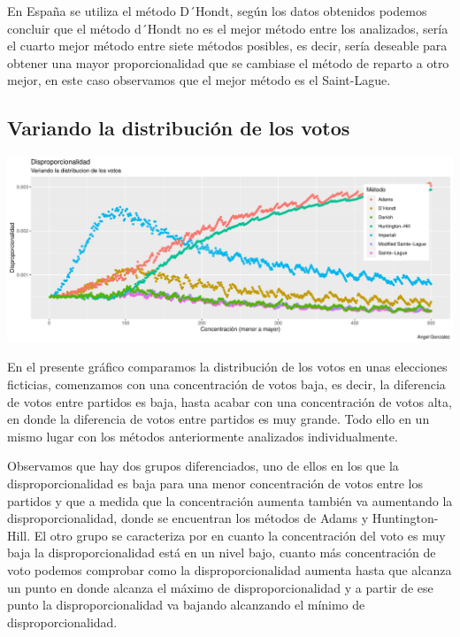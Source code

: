 \documentclass[12pt,a4paper,]{book}
\numberwithin{dummy}{section}
\theoremstyle{ocrenumbox}
\theoremstyle{blacknumex}
\theoremstyle{blacknumbox}
\theoremstyle{ocrenum}
\theoremstyle{ocrenum}
\begin{document}
En España se utiliza el método D´Hondt, según los datos obtenidos
podemos concluir que el método d´Hondt no es el mejor método entre los
analizados, sería el cuarto mejor método entre siete métodos posibles,
es decir, sería deseable para obtener una mayor proporcionalidad que se
cambiase el método de reparto a otro mejor, en este caso observamos que
el mejor método es el Saint-Lague.

\hypertarget{variando-la-distribuciuxf3n-de-los-votos}{%
\subsection{Variando la distribución de los
votos}\label{variando-la-distribuciuxf3n-de-los-votos}}

\begin{center}\includegraphics[width=0.95\linewidth]{figurasR/unnamed-chunk-46-1} \end{center}

En el presente gráfico comparamos la distribución de los votos en unas
elecciones ficticias, comenzamos con una concentración de votos baja, es
decir, la diferencia de votos entre partidos es baja, hasta acabar con
una concentración de votos alta, en donde la diferencia de votos entre
partidos es muy grande. Todo ello en un mismo lugar con los métodos
anteriormente analizados individualmente.

Observamos que hay dos grupos diferenciados, uno de ellos en los que la
disproporcionalidad es baja para una menor concentración de votos entre
los partidos y que a medida que la concentración aumenta también va
aumentando la disproporcionalidad, donde se encuentran los métodos de
Adams y Huntington-Hill. El otro grupo se caracteriza por en cuanto la
concentración del voto es muy baja la disproporcionalidad está en un
nivel bajo, cuanto más concentración de voto podemos comprobar como la
disproporcionalidad aumenta hasta que alcanza un punto en donde alcanza
el máximo de disproporcionalidad y a partir de ese punto la
disproporcionalidad va bajando alcanzando el mínimo de
disproporcionalidad.
\end{document}
